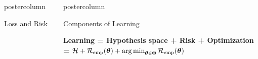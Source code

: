 \documentclass{beamer}
\newlength{\columnheight} %
\begin{document}
\begin{frame}[fragile]{}
\begin{columns}
\begin{column}{.31\textwidth}
\begin{beamercolorbox}[center]{postercolumn}
\begin{minipage}{.98\textwidth}
{\begin{myblock}{Loss and Risk}
\end{myblock}
				}
			\end{minipage}
		\end{beamercolorbox}
	\end{column}
	\begin{column}{.31\textwidth}
		\begin{beamercolorbox}[center]{postercolumn}
			\begin{minipage}{.98\textwidth}
				\parbox[t][\columnheight]{\textwidth}{
\begin{myblock}{Components of Learning}

\textbf{Learning = Hypothesis space + Risk + Optimization} \\
 \textbf{= }$ \mathcal{H} + \mathcal{R}_{\text{emp}}(\bm{\theta}) + \operatorname{arg\,min}_{\bm{\theta} \in \Theta} 
\mathcal{R}_{\text{emp}}(\bm{\theta})$

% 
% 
% 
% 
% 
% 
% 
% 
% 


\end{myblock}

}
\end{minipage}
\end{beamercolorbox}
\end{column}
\end{columns}
\end{frame}
\end{document}
